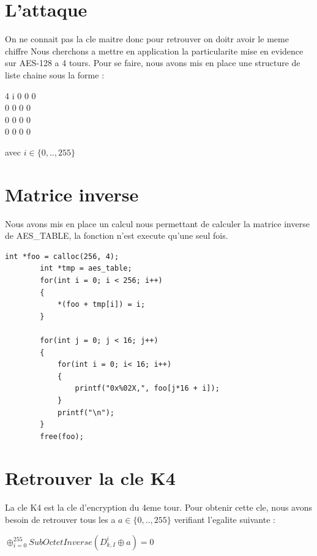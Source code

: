 \documentclass[10pt, a4paper]{report}
\begin{document}
	\section{L'attaque}
	On ne connait pas la cle maitre donc pour retrouver on doitr avoir le meme chiffre
	Nous cherchons a mettre en application la particularite mise en evidence sur AES-128 a 4 tours. Pour se faire, nous avons mis en place une structure de liste chaine sous la forme : \\
	\begin{center}
		\begin{tabular}{4}
			i 0 0 0 \\ 0 0 0 0 \\ 0 0 0 0\\ 0 0 0 0\\
		\end{tabular}
		avec \begin{math}
			i \in \{0,..,255\}
		\end{math} \\
	\end{center}


	\section{Matrice inverse}
	Nous avons mis en place un calcul nous permettant de calculer la matrice inverse de AES\_TABLE, la fonction n'est execute qu'une seul fois.
	\begin{lstlisting}[style=CStyle]
		int *foo = calloc(256, 4);
		int *tmp = aes_table;
		for(int i = 0; i < 256; i++)
		{
			*(foo + tmp[i]) = i;
		}
		
		for(int j = 0; j < 16; j++)
		{
			for(int i = 0; i< 16; i++)
			{
				printf("0x%02X,", foo[j*16 + i]);
			}
			printf("\n");
		}
		free(foo);
	\end{lstlisting}

	
	\section{Retrouver la cle K4}
	La cle K4 est la cle d'encryption du 4eme tour. Pour obtenir cette cle, nous avons besoin de retrouver tous les a 
	 \begin{math}
		a \in \{0,..,255\}
	\end{math} verifiant l'egalite suivante : \\ 
	\begin{center}
		\large{\begin{math}
					\oplus^{255}_{i=0} SubOctetInverse(D_{k,I}^i\oplus a) = 0
		\end{math}}\\
	\end{center}
	
\end{document}
